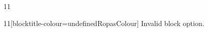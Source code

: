 \documentclass[paper=A4]{ropas-poster}
\begin{document}
\begin{postergrid}{1}{1}
\begin{posterblock}{1}{1}[blocktitle-colour=undefinedRopasColour]
Invalid block option.
\end{posterblock}
\end{postergrid}
\end{document}

